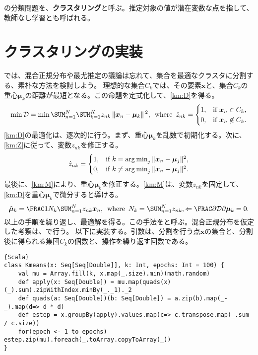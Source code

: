 \documentclass[10pt,a4paper]{book}
\begin{document}
の分類問題を、\textbf{クラスタリング}と呼ぶ。推定対象の値が潜在変数な点を指して、教師なし学習とも呼ばれる。

\section{クラスタリングの実装\label{sect:km}}

では、混合正規分布や最尤推定の議論は忘れて、集合を最適なクラスタに分割する、素朴な方法を検討しよう。
理想的な集合$C_k$では、その要素$\bm{x}$と、集合$C_k$の重心$\bm{\mu}_k$の距離が最短となる。この命題を定式化して、\eqref{km:D}を得る。
%
\begin{equation}
\label{eq:km:D}
\min \mathcal{D} =
\min \sum_{n=1}^N \sum_{k=1}^K z_{nk} \norm{\bm{x}_n-\bm{\mu}_k}^2,
\where
\hat{z}_{nk} =
\begin{cases}
1,& \text{if $\bm{x}_n     \in C_k$},\\
0,& \text{if $\bm{x}_n \not\in C_k$}.
\end{cases}
\end{equation}
%
\eqref{km:D}の最適化は、逐次的に行う。まず、重心$\bm{\mu}_k$を乱数で初期化する。次に、\eqref{km:Z}に従って、変数$z_{nk}$を修正する。
%
\begin{equation}
\label{eq:km:Z}
\hat{z}_{nk} =
\begin{cases}
1,& \text{if $k=   \argmin_j\norm{\bm{x}_n-\bm{\mu}_j}^2$},\\
0,& \text{if $k\neq\argmin_j\norm{\bm{x}_n-\bm{\mu}_j}^2$}.
\end{cases}
\end{equation}
%
最後に、\eqref{km:M}により、重心$\bm{\mu}_k$を修正する。\eqref{km:M}は、変数$z_{nk}$を固定して、\eqref{km:D}を重心$\bm{\mu}_k$で微分すると導ける。
%
\begin{equation}
\label{eq:km:M}
\hat{\bm{\mu}}_k = \frac{1}{N_k} \sum_{n=1}^N z_{nk} \bm{x}_n,
\where
N_k = \sum_{n=1}^N z_{nk},
\Leftarrow
\pdiff{\mathcal{D}}{\bm{\mu}_k} = 0.
\end{equation}
%
以上の手順を繰り返し、最適解を得る。この手法を\kmean{}と呼ぶ。混合正規分布を仮定した考察は、で行う。
以下に実装する。引数は、分割を行う点$\bm{x}$の集合と、分割後に得られる集団$C_k$の個数と、操作を繰り返す回数である。

\begin{Verbatim}{Scala}
class Kmeans(x: Seq[Seq[Double]], k: Int, epochs: Int = 100) {
	val mu = Array.fill(k, x.map(_.size).min)(math.random)
	def apply(x: Seq[Double]) = mu.map(quads(x)(_).sum).zipWithIndex.minBy(_._1)._2
	def quads(a: Seq[Double])(b: Seq[Double]) = a.zip(b).map(_-_).map(d=> d * d)
	def estep = x.groupBy(apply).values.map(c=> c.transpose.map(_.sum / c.size))
	for(epoch <- 1 to epochs) estep.zip(mu).foreach(_.toArray.copyToArray(_))
}
\end{Verbatim}
\end{document}
